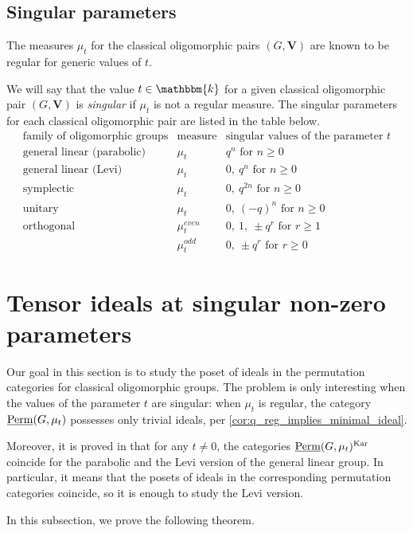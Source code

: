 \documentclass[11pt,a4paper]{amsart}
\theoremstyle{plain}%
\theoremstyle{definition}
\theoremstyle{remark}
\newcommand{\V}{\mathbf{V}}
\newcommand{\Perm}{\underline{{\rm Perm}}}
\newcommand{\kk}{\mathbbm{k}}
\newcommand{\Kar}{\mathrm{Kar}}
\begin{document}
\subsection{Singular parameters}\label{ssec:singular_param}
The measures $\mu_t$ for the classical oligomorphic pairs $(G, \V)$ are known to be regular  for generic values of $t$. 


We will say that the value $t\in \kk$ for a given classical oligomorphic pair $(G, \V)$ is \emph{singular} if $\mu_t$ is not a regular measure. The singular parameters for each classical oligomorphic pair are listed in the table below. \[
\begin{array}{c|c|c}
\text{family of oligomorphic groups}&\text{measure}&\text{singular values of the parameter } t\\ \hline
\text{general linear (parabolic)} &\mu_{t}&q^n \text{ for } n\geq 0\\
\text{general linear (Levi)} &\mu_{t}&0,~q^n \text{ for } n\geq 0\\
\text{symplectic} &\mu_{t}&0,~q^{2n} \text{ for }  n\geq 0\\
\text{unitary}&\mu_{t}&0, ~(-q)^n \text{ for }  n\geq 0\\
\text{orthogonal}&\mu^{even}_{t}&0,~ 1,~ \pm q^r \text{ for } r\geq 1\\
&\mu^{odd}_{{t}}& 0, ~\pm q^r \text{ for } r\geq 0
\end{array}
\]



\section{Tensor ideals at singular non-zero parameters}\label{sec:singular-non-zero}
Our goal in this section is to study the poset of ideals in the permutation categories for classical oligomorphic groups. The problem is only interesting when the values of the parameter $t$ are {singular}: when $\mu_t$ is regular, the category $\Perm(G, \mu_t)$ possesses only trivial ideals, per \cref{cor:q_reg_implies_minimal_ideal}. 

Moreover, it is proved in \cite{HS-classical} that for any $t\neq 0$, the categories $\Perm(G, \mu_t)^{\Kar}$ coincide for the parabolic and the Levi version of the general linear group. In particular, it means that the posets of ideals in the corresponding permutation categories coincide, so it is enough to study the Levi version.


In this subsection, we prove the following theorem.
\end{document}
